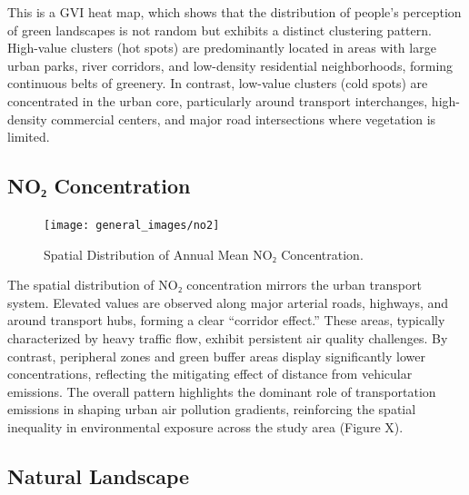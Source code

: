\documentclass[
  12pt,
  oneside]{book}
\begin{document}
This is a GVI heat map, which shows that the distribution of people's perception of green landscapes is not random but exhibits a distinct clustering pattern. High-value clusters (hot spots) are predominantly located in areas with large urban parks, river corridors, and low-density residential neighborhoods, forming continuous belts of greenery. In contrast, low-value clusters (cold spots) are concentrated in the urban core, particularly around transport interchanges, high-density commercial centers, and major road intersections where vegetation is limited.

\subsection{NO₂ Concentration}\label{noux2082-concentration}

\begin{figure}

{\centering \texttt{[image: general\_images/no2]} 

}

\caption{Spatial Distribution of Annual Mean NO₂ Concentration.}\label{fig:no2}
\end{figure}

The spatial distribution of NO₂ concentration mirrors the urban transport system. Elevated values are observed along major arterial roads, highways, and around transport hubs, forming a clear ``corridor effect.'' These areas, typically characterized by heavy traffic flow, exhibit persistent air quality challenges. By contrast, peripheral zones and green buffer areas display significantly lower concentrations, reflecting the mitigating effect of distance from vehicular emissions. The overall pattern highlights the dominant role of transportation emissions in shaping urban air pollution gradients, reinforcing the spatial inequality in environmental exposure across the study area (Figure X).

\subsection{Natural Landscape}\label{natural-landscape}
\end{document}
